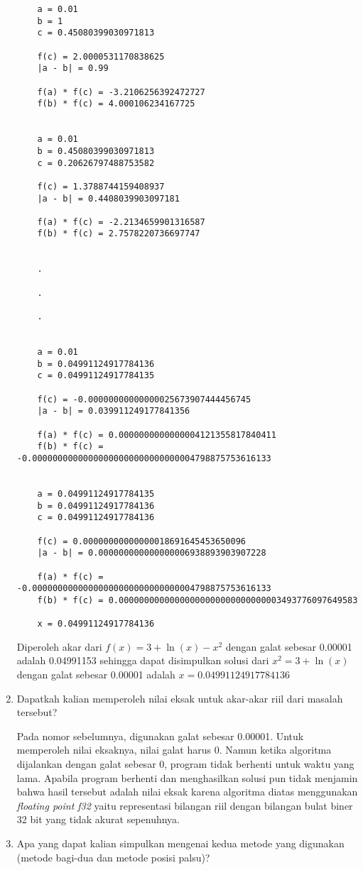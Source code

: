\documentclass[12pt]{article}
\begin{document}
\begin{enumerate}
{\begin{lstlisting}
    a = 0.01
    b = 1
    c = 0.45080399030971813

    f(c) = 2.0000531170838625
    |a - b| = 0.99

    f(a) * f(c) = -3.2106256392472727
    f(b) * f(c) = 4.000106234167725


    a = 0.01
    b = 0.45080399030971813
    c = 0.20626797488753582

    f(c) = 1.3788744159408937
    |a - b| = 0.4408039903097181

    f(a) * f(c) = -2.2134659901316587
    f(b) * f(c) = 2.7578220736697747


    .

    .

    .


    a = 0.01
    b = 0.04991124917784136
    c = 0.04991124917784135

    f(c) = -0.00000000000000025673907444456745
    |a - b| = 0.039911249177841356

    f(a) * f(c) = 0.0000000000000004121355817840411
    f(b) * f(c) = -0.00000000000000000000000000000004798875753616133


    a = 0.04991124917784135
    b = 0.04991124917784136
    c = 0.04991124917784136

    f(c) = 0.00000000000000018691645453650096
    |a - b| = 0.000000000000000006938893903907228

    f(a) * f(c) = -0.00000000000000000000000000000004798875753616133
    f(b) * f(c) = 0.00000000000000000000000000000003493776097649583

    x = 0.04991124917784136
        \end{lstlisting}
        Diperoleh akar dari $ f(x) = 3 + \ln(x) - x^2 $ dengan galat sebesar 0.00001 adalah 0.04991153 sehingga dapat disimpulkan solusi dari $ x^2 = 3 + \ln(x) $ dengan galat sebesar 0.00001 adalah $ x = 0.04991124917784136 $
    }\bigskip
    \item {
        Dapatkah kalian memperoleh nilai eksak untuk akar-akar riil dari masalah tersebut?\bigskip

        Pada nomor sebelumnya, digunakan galat sebesar 0.00001. Untuk memperoleh nilai eksaknya, nilai galat harus 0. Namun ketika algoritma dijalankan dengan galat sebesar 0, program tidak berhenti untuk waktu yang lama. Apabila program berhenti dan menghasilkan solusi pun tidak menjamin bahwa hasil tersebut adalah nilai eksak karena algoritma diatas menggunakan \emph{floating point f32} yaitu representasi bilangan riil dengan bilangan bulat biner 32 bit yang tidak akurat sepenuhnya.
    }\bigskip
    \item {
        Apa yang dapat kalian simpulkan mengenai kedua metode yang digunakan (metode bagi-dua dan metode posisi palsu)?\bigskip

}
\end{enumerate}
\end{document}
